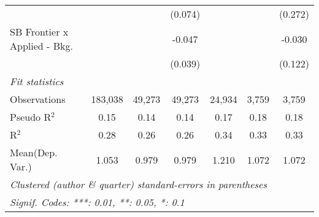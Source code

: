 \begin{tabular}{lcccccc}
                                  &               &              & (0.074)     &              &         & (0.272)\\   
   SB Frontier x Applied - Bkg.   &               &              & -0.047      &              &         & -0.030\\   
                                  &               &              & (0.039)     &              &         & (0.122)\\   
   \midrule
   \emph{Fit statistics}\\
   Observations                   & 183,038       & 49,273       & 49,273      & 24,934       & 3,759   & 3,759\\  
   Pseudo R$^2$                   & 0.15          & 0.14         & 0.14        & 0.17         & 0.18    & 0.18\\  
   R$^2$                          & 0.28          & 0.26         & 0.26        & 0.34         & 0.33    & 0.33\\  
Mean(Dep. Var.) & 1.053 & 0.979 & 0.979 & 1.210 & 1.072 & 1.072 \\
   \midrule \midrule
   \multicolumn{7}{l}{\emph{Clustered (author \& quarter) standard-errors in parentheses}}\\
   \multicolumn{7}{l}{\emph{Signif. Codes: ***: 0.01, **: 0.05, *: 0.1}}\\
\end{tabular}
\par\endgroup

